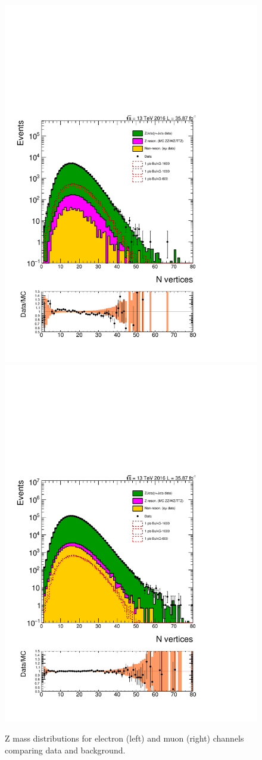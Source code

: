 \begin{figure}[htbp!]
\centering
\includegraphics[width=0.46\linewidth,page=8]{figures/ReMiniSummer16_DT_PhReMiniMCRcFixXsec_GMCPhPtWt_tightzpt50_puWeightsummer16_muoneg_gjet_metfilter_unblind_el_log_1pb.pdf}
\includegraphics[width=0.46\linewidth,page=8]{figures/ReMiniSummer16_DT_PhReMiniMCRcFixXsec_GMCPhPtWt_tightzpt50_puWeightsummer16_muoneg_gjet_metfilter_unblind_mu_log_1pb.pdf}
\caption{Z mass distributions for electron (left) and muon (right) channels
comparing data and background.}
\label{fig:gjet_mz}
\end{figure}


